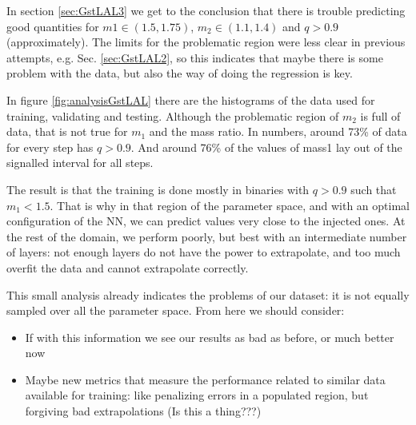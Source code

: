 \documentclass[prd,aps,twocolumn,a4paper,showkeys,nofootinbib]{revtex4-1}
\begin{document}
In section \ref{sec:GstLAL3} we get to the conclusion that there is trouble predicting good quantities for $m1\in(1.5,1.75)$, $m_2\in(1.1,1.4)$ and $q>0.9$ (approximately). The limits for the problematic region were less clear in previous attempts, e.g. Sec. \ref{sec:GstLAL2}, so this indicates that maybe there is some problem with the data, but also the way of doing the regression is key.

In figure \ref{fig:analysisGstLAL} there are the histograms of the data used for training, validating and testing. Although the problematic region of $m_2$ is full of data, that is not true for $m_1$ and the mass ratio. In numbers, around 73\% of data for every step has $q>0.9$. And around 76\% of the values of mass1 lay out of the signalled interval for all steps. 

The result is that the training is done mostly in binaries with $q>0.9$ such that $m_1<1.5$. That is why in that region of the parameter space, and with an optimal configuration of the NN, we can predict values very close to the injected ones. At the rest of the domain, we perform poorly, but best with an intermediate number of layers: not enough layers do not have the power to extrapolate, and too much overfit the data and cannot extrapolate correctly.

This small analysis already indicates the problems of our dataset: it is not equally sampled over all the parameter space. From here we should consider:
\begin{itemize}
\item If with this information we see our results as bad as before, or much better now
\item Maybe new metrics that measure the performance related to similar data available for training: like penalizing errors in a populated region, but forgiving bad extrapolations (Is this a thing???)
\end{itemize}

\end{document}
